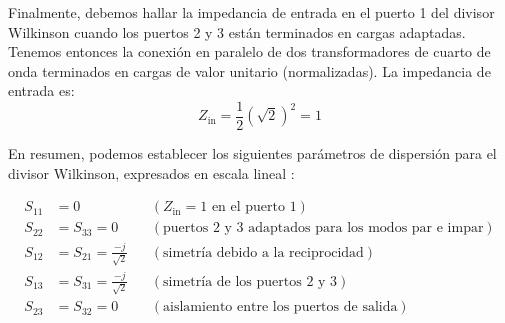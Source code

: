 Finalmente, debemos hallar la impedancia de entrada en el puerto 1 del divisor Wilkinson cuando los puertos 2 y 3 están terminados en cargas adaptadas. Tenemos entonces la conexión en paralelo de dos transformadores de cuarto de onda terminados en cargas de valor unitario (normalizadas). La impedancia de entrada es:
\begin{equation}
Z_{\text{in}} = \frac{1}{2} (\sqrt{2})^2 = 1
\label{eq:zin_wilkinson}
\end{equation}

En resumen, podemos establecer los siguientes parámetros de dispersión para el divisor Wilkinson, expresados en escala lineal \cite{pozar}:

\begin{align*}
S_{11} &= 0 && (Z_{\text{in}} = 1 \text{ en el puerto 1}) \\
S_{22} &= S_{33} = 0 && (\text{puertos 2 y 3 adaptados para los modos par e impar}) \\
S_{12} &= S_{21} = \frac{-j}{\sqrt{2}} && (\text{simetría debido a la reciprocidad}) \\
S_{13} &= S_{31} = \frac{-j}{\sqrt{2}} && (\text{simetría de los puertos 2 y 3}) \\
S_{23} &= S_{32} = 0 && (\text{aislamiento entre los puertos de salida})
\end{align*}
